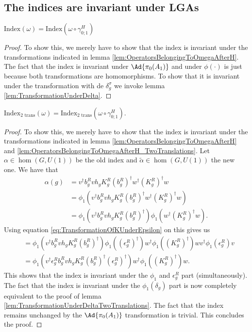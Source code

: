 \subsection{The indices are invariant under LGAs}\label{sec:IndexInvariantUnderLGA}
\begin{theorem}\label{thrm:IndexInvariantUnderLGA}
	$\textrm{Index}(\omega)=\textrm{Index}(\omega\circ\gamma^H_{0;1})$
\end{theorem}
\begin{proof}
	To show this, we merely have to show that the index is invariant under the transformations indicated in lemma \ref{lem:OperatorsBelongingToOmegaAfterH}. The fact that the index is invariant under $\Ad{\pi_0(A_1)}$ and under $\phi(\cdot)$ is just because both transformations are homomorphisms. To show that it is invariant under the transformation with de $\delta^\sigma_g$ we invoke lemma \ref{lem:TransformationUnderDelta}.
\end{proof}
\begin{theorem}\label{thrm:IndexInvariantUnderLGA_TwoTrans}
	$\textrm{Index}_{\text{2 trans}}(\omega)=\textrm{Index}_{\text{2 trans}}(\omega\circ\gamma^H_{0;1}).$
\end{theorem}
\begin{proof}
	To show this, we merely have to show that the index is invariant under the transformations indicated in lemma \ref{lem:OperatorsBelongingToOmegaAfterH} and \ref{lem:OperatorsBelongingToOmegaAfterH_TwoTranslations}. Let $\alpha\in\hom(G,U(1))$ be the old index and $\tilde{\alpha}\in\hom(G,U(1))$ the new one. We have that
	\begin{align}
		\alpha(g)&=v^\dagger b_g^R v h_g K_g^R (b_g^R)^\dagger w^\dagger (K_g^R)^\dagger w\\
		&=\phi_1(v^\dagger b_g^R v h_g K_g^R (b_g^R)^\dagger w^\dagger (K_g^R)^\dagger w)\\
		&=\phi_1(v^\dagger b_g^R v h_g K_g^R (b_g^R)^\dagger)\phi_1( w^\dagger (K_g^R)^\dagger w).
	\end{align}
	Using equation \eqref{eq:TransformationOfKUnderEpsilon} on this gives us
	\begin{align}
		&=\phi_1(v^\dagger b_g^R v h_g K_g^R (b_g^R)^\dagger)\phi_1((\epsilon_g^R)^\dagger)w^\dagger\phi_1(  (K_g^R)^\dagger )wv^\dagger \phi_1(\epsilon_g^R)v\\
		&=\phi_1(v^\dagger \epsilon_g^R b_g^R v h_g K_g^R (b_g^R)^\dagger (\epsilon_g^R)^\dagger)w^\dagger\phi_1(  (K_g^R)^\dagger )w.
	\end{align}
	This shows that the index is invariant under the $\phi_1$ and $\epsilon^R_g$ part (simultaneously). The fact that the index is invariant under the $\phi_1(\delta_g)$ part is now completely equivalent to the proof of lemma \ref{lem:TransformationUnderDeltaTwoTranslations}. The fact that the index remains unchanged by the $\Ad{\pi_0(A_1)}$ transformation is trivial. This concludes the proof.
\end{proof}
